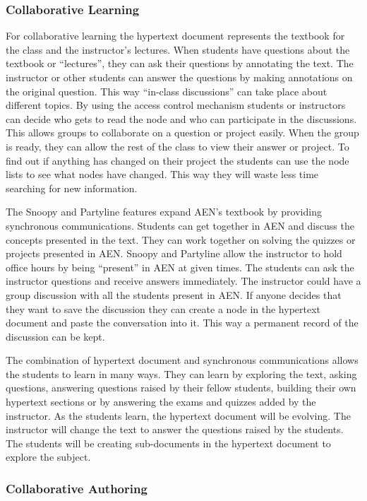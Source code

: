 \subsubsection{Collaborative Learning}
For collaborative learning the hypertext document represents the textbook
for the class and the instructor's lectures. When students have questions
about the textbook or ``lectures'', they can ask their questions by
annotating the text.  The instructor or other students can answer
the questions by making annotations on the original question.  This way
``in-class discussions'' can take place about different topics.  By using the
access control mechanism students or instructors can decide who gets to
read the node and who can participate in the discussions.  This allows
groups to collaborate on a question or project easily.  When the group is
ready, they can allow the rest of the class to view their answer or project.
To find out if anything has changed on their project the students can use
the node lists to see what nodes have changed.  This way they will waste
less time searching for new information.

The Snoopy and Partyline features expand AEN's textbook by providing
synchronous communications. Students can get together in AEN and discuss the
concepts presented in the text.  They can work together on solving the
quizzes or projects presented in AEN.  Snoopy and Partyline allow the
instructor to hold office hours by being ``present'' in AEN at given
times.  The students can ask the instructor questions and receive
answers immediately.  The instructor could have a group discussion with all
the students present in AEN. If anyone decides that they want to save the
discussion they can create a node in the hypertext document and paste the
conversation into it.  This way a permanent record of the discussion can
be kept. 

The combination of hypertext document and synchronous communications allows
the students to learn in many ways.  They can learn by exploring the text,
asking questions, answering questions raised by their fellow students,
building their own hypertext sections or by answering the exams and quizzes
added by the instructor.  As the students learn, the hypertext document
will be evolving.  The instructor will change the text to answer the
questions raised by the students.  The students will be creating
sub-documents in the hypertext document to explore the subject.  
 

\subsubsection{Collaborative Authoring}

